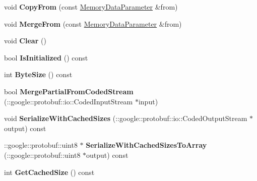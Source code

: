 \begin{DoxyCompactItemize}
void {\bfseries Copy\+From} (const \mbox{\hyperlink{classcaffe_1_1_memory_data_parameter}{Memory\+Data\+Parameter}} \&from)
\item 
\mbox{\label{classcaffe_1_1_memory_data_parameter_a5e830b2488cc67b8b1c345b3b3ae753f}} 
void {\bfseries Merge\+From} (const \mbox{\hyperlink{classcaffe_1_1_memory_data_parameter}{Memory\+Data\+Parameter}} \&from)
\item 
\mbox{\label{classcaffe_1_1_memory_data_parameter_a58eb7b6ef025e70fde2b6a270cfa7c25}} 
void {\bfseries Clear} ()
\item 
\mbox{\label{classcaffe_1_1_memory_data_parameter_acfa32cd1f9f06d66bd6f8ab803a9dc92}} 
bool {\bfseries Is\+Initialized} () const
\item 
\mbox{\label{classcaffe_1_1_memory_data_parameter_a057b61e829db73165267bf042ee7f9f2}} 
int {\bfseries Byte\+Size} () const
\item 
\mbox{\label{classcaffe_1_1_memory_data_parameter_a7ca66e7cfb221f0907ef988a839e67bf}} 
bool {\bfseries Merge\+Partial\+From\+Coded\+Stream} (\+::google\+::protobuf\+::io\+::\+Coded\+Input\+Stream $\ast$input)
\item 
\mbox{\label{classcaffe_1_1_memory_data_parameter_af3e810e9561161452424c923dbfc349d}} 
void {\bfseries Serialize\+With\+Cached\+Sizes} (\+::google\+::protobuf\+::io\+::\+Coded\+Output\+Stream $\ast$output) const
\item 
\mbox{\label{classcaffe_1_1_memory_data_parameter_aaf38658e0bb1e90c1010a5e42b619259}} 
\+::google\+::protobuf\+::uint8 $\ast$ {\bfseries Serialize\+With\+Cached\+Sizes\+To\+Array} (\+::google\+::protobuf\+::uint8 $\ast$output) const
\item 
\mbox{\label{classcaffe_1_1_memory_data_parameter_a9d5e0fd7527ab8574dfcc52fdcf8aaa1}} 
int {\bfseries Get\+Cached\+Size} () const
\item 
\mbox{\label{classcaffe_1_1_memory_data_parameter_aad75fd45a3bc115c6d0853a0ef6d1d1d}} 

\end{DoxyCompactItemize}

